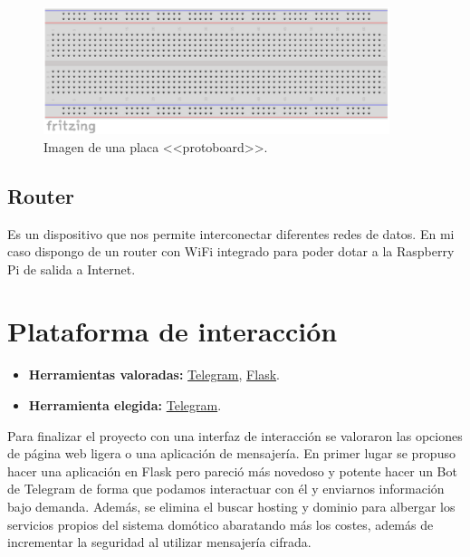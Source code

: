 \begin{figure}
    \centering
    \includegraphics[width=0.9\textwidth]{img/protoboard.pdf}
    \caption{Imagen de una placa <<protoboard>>. } \label{Img:Protoboard}
\end{figure}

\subsection{Router}
Es un dispositivo que nos permite interconectar diferentes redes de datos. En mi caso dispongo de un router con WiFi integrado para poder dotar a la Raspberry Pi de salida a Internet.

\section{Plataforma de interacción}
\begin{itemize}
    \item \textbf{Herramientas valoradas:} \href{https://telegram.org/}{Telegram}, \href{https://palletsprojects.com/p/flask/}{Flask}.
    \item \textbf{Herramienta elegida:} \href{https://telegram.org/}{Telegram}.
\end{itemize}
Para finalizar el proyecto con una interfaz de interacción se valoraron las opciones de página web ligera o una aplicación de mensajería.
En primer lugar se propuso hacer una aplicación en Flask pero pareció más novedoso y potente hacer un Bot de Telegram de forma que podamos interactuar con él y enviarnos información bajo demanda. Además, se elimina el buscar hosting y dominio para albergar los servicios propios del sistema domótico abaratando más los costes, además de incrementar la seguridad al utilizar mensajería cifrada.

